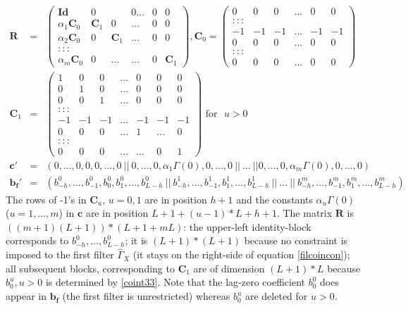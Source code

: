 \documentclass[11pt]{article}
\begin{document}
\begin{eqnarray}
\mathbf{R}&=&\left(\begin{array}{cccccc}
\mathbf{Id}&0&&0...&0&0\\
\alpha_1\mathbf{C}_0&\mathbf{C}_1&0&...&0&0\\
\alpha_2\mathbf{C}_0&0&\mathbf{C}_1&...&0&0\\
:::\\
\alpha_m\mathbf{C}_0&0&...&...&0&\mathbf{C}_1
\end{array}\right), 
\mathbf{C}_0=\left(\begin{array}{cccccc}
0&0&0&...&0&0\\
:::\\
-1&-1&-1&...&-1&-1\\
0&0&0&...&0&0\\
:::\\
0&0&0&...&0&0
\end{array}\right)
\label{Rcoint}\\
\mathbf{C}_{1}&=&\left(\begin{array}{ccccccc}
1&0&0&...&0&0&0\\
0&1&0&...&0&0&0\\
0&0&1&...&0&0&0\\
:::\\
-1&-1&-1&...&-1&-1&-1\\
0&0&0&...&1&...&0\\
:::\\
0&0&0&...&...&0&1
\end{array}\right)\textrm{~for ~}u>0\label{Rcoint3}\\
\mathbf{c}'&=&(0,...,0,0,0,...,0~||~0,...,0,\alpha_1 \Gamma(0),0,...,0~||~...~||0,...,0,\alpha_m\Gamma(0),0,...,0)\nonumber\\
\mathbf{b_f}'&=&(b_{-h}^0,...,b_{-1}^0,b_0^0,b_1^0,...,b_{L-h}^0~||~b_{-h}^1,...,b_{-1}^1,b_1^1,...,b_{L-h}^1~||~...~||~b_{-h}^m,...,b_{-1}^m,b_1^m,...,b_{L-h}^m)\nonumber
\end{eqnarray}
The rows of -1's in $\mathbf{C}_u$, $u=0,1$ are in position $h+1$ and the constants $\alpha_u\Gamma(0)$ ($u=1,...,m$) in $\mathbf{c}$ are in position $L+1+(u-1)*L+h+1$. The matrix $\mathbf{R}$ is $((m+1)( L+1))*(L+1+m L)$: the upper-left identity-block corresponds to $b_{-h}^0,...,b_{L-h}^0$; it is $(L+1)*(L+1)$ because no constraint is imposed to the first filter $\hat{\Gamma}_X$ (it stays on the right-side of  equation \ref{filcoincon}); all subsequent blocks, corresponding to $\mathbf{C}_1$ are of dimension $(L+1)*L$ because $b_0^u,u>0$ is determined by \ref{coint33}. Note that the lag-zero coefficient $b_0^0$ does appear in $\mathbf{b_f}$ (the first filter is unrestricted) whereas $b_0^u$ are deleted for $u>0$.\\
\end{document}
